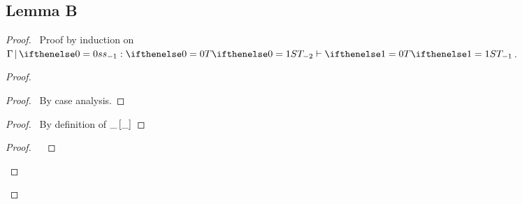 \documentclass[a4paper]{article}
\begin{document}
\subsection{Lemma B}
\begin{proof}
  \assume{\begin{enumerate}
    \item $\judge \aContext \aTerm {\aType}$ \label{lB:H1}
    \item $\frameJudge{\aContext}{\aStack}{\aType}{\aType[1]}$ \label{lB:H2}
  \end{enumerate}}
  \prove{$\judge \aContext {\stackapp \aStack \aTerm} {\aType[1]}$}
  \pfsketch\ Proof by induction on $\frameJudge{\aContext}{\aStack}{\aType}{\aType[1]}$.
  \begin{proof}
    \begin{proof}
      \pf\ By case analysis.
    \end{proof}
    \begin{proof}
      \pf\ By definition of $\_ \left[ \_ \right]$
    \end{proof}
    \qedstep
    \begin{proof}
        \pf\ 
                    {\judge {\aContext}
                    {\stackapp{\emptyStack}{\aTerm}}
                    {\aType}}
                    {}
    \end{proof}
  \end{proof}


\end{proof}
\end{document}
